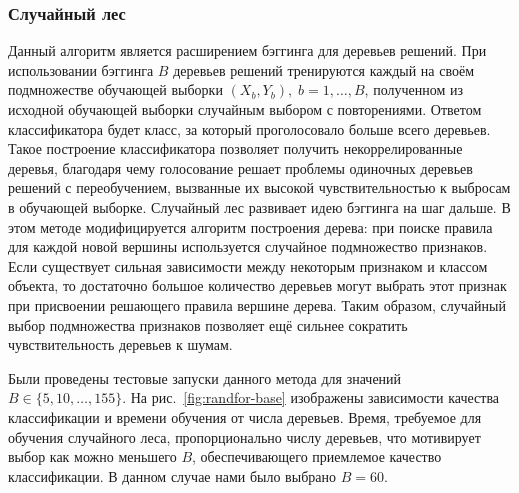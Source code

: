 \subsubsection{Случайный лес}
Данный алгоритм является расширением бэггинга для деревьев решений. При использовании бэггинга \(B\) деревьев решений тренируются каждый на своём подмножестве обучающей выборки \(\left(X_b, Y_b\right),\;b=1,\dotsc,B\), полученном из исходной обучающей выборки случайным выбором с повторениями. Ответом классификатора будет класс, за который проголосовало больше всего деревьев. Такое построение классификатора позволяет получить некоррелированные деревья, благодаря чему голосование решает проблемы одиночных деревьев решений с переобучением, вызванные их высокой чувствительностью к выбросам в обучающей выборке. Случайный лес развивает идею бэггинга на шаг дальше. В этом методе модифицируется алгоритм построения дерева: при поиске правила для каждой новой вершины используется случайное подмножество признаков. Если существует сильная зависимости между некоторым признаком и классом объекта, то достаточно большое количество деревьев могут выбрать этот признак при присвоении решающего правила вершине дерева. Таким образом, случайный выбор подмножества признаков позволяет ещё сильнее сократить чувствительность деревьев к шумам.

Были проведены тестовые запуски данного метода для значений \(B\in\{5,10,\dotsc,155\}\). На рис.~\ref{fig:randfor-base} изображены зависимости качества классификации и времени обучения от числа деревьев. Время, требуемое для обучения случайного леса, пропорционально числу деревьев, что мотивирует выбор как можно меньшего \(B\), обеспечивающего приемлемое качество классификации. В данном случае нами было выбрано \(B=60\).

